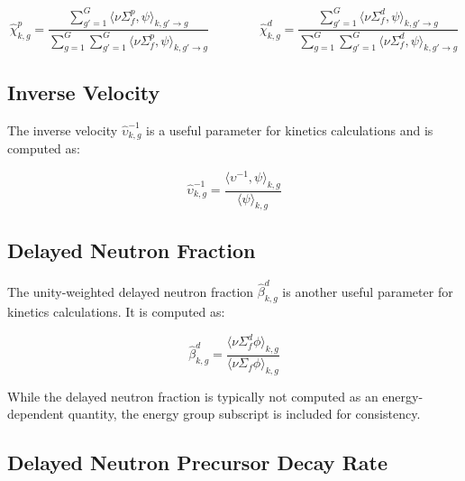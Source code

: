 \begin{equation}
\label{eqn:chi-specific}
\hat{\chi}_{k,g}^{p} = \frac{\displaystyle\sum\limits_{g'=1}^{G} \langle \nu\Sigma_{f}^{p}, \psi \rangle_{k,g'\rightarrow g}}{\displaystyle\sum\limits_{g=1}^{G} \displaystyle\sum\limits_{g'=1}^{G} \langle \nu\Sigma_{f}^{p}, \psi \rangle_{k,g'\rightarrow g}} \qquad \qquad \hat{\chi}_{k,g}^{d} = \frac{\displaystyle\sum\limits_{g'=1}^{G} \langle \nu\Sigma_{f}^{d}, \psi \rangle_{k,g'\rightarrow g}}{\displaystyle\sum\limits_{g=1}^{G} \displaystyle\sum\limits_{g'=1}^{G} \langle \nu\Sigma_{f}^{d}, \psi \rangle_{k,g'\rightarrow g}}
\end{equation}

\subsection{Inverse Velocity}
\label{subsubsec:tally-types-inv-vel}

The inverse velocity $\hat{\upsilon}_{k,g}^{-1}$ is a useful parameter for kinetics calculations and is computed as:

\begin{equation}
\label{eqn:inverse-velocity}
\hat{\upsilon}_{k,g}^{-1} = \frac{\langle \upsilon^{-1}, \psi \rangle_{k,g}}{\langle \psi \rangle_{k,g}}
\end{equation}

\subsection{Delayed Neutron Fraction}
\label{subsubsec:tally-types-beta}

The unity-weighted delayed neutron fraction $\hat{\beta}_{k,g}^{d}$ is another useful parameter for kinetics calculations. It is computed as:

\begin{equation}
\label{eqn:beta}
\hat{\beta}_{k,g}^{d} = \frac{\langle \nu \Sigma_f^d \phi \rangle_{k,g}}{\langle \nu \Sigma_f \phi \rangle_{k,g}}
\end{equation}

\noindent While the delayed neutron fraction is typically not computed as an energy-dependent quantity, the energy group subscript is included for consistency.

\subsection{Delayed Neutron Precursor Decay Rate}
\label{subsubsec:tally-types-lambda}

